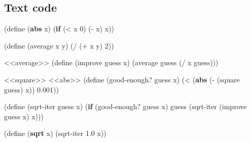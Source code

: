 \documentclass[
]{article}
\newenvironment{Shaded}{}{}
\newcommand{\DecValTok}[1]{\textcolor[rgb]{0.25,0.63,0.44}{#1}}
\newcommand{\ExtensionTok}[1]{#1}
\newcommand{\FloatTok}[1]{\textcolor[rgb]{0.25,0.63,0.44}{#1}}
\newcommand{\FunctionTok}[1]{\textcolor[rgb]{0.02,0.16,0.49}{#1}}
\newcommand{\KeywordTok}[1]{\textcolor[rgb]{0.00,0.44,0.13}{\textbf{#1}}}
\newcommand{\NormalTok}[1]{#1}
\newcommand{\OperatorTok}[1]{\textcolor[rgb]{0.40,0.40,0.40}{#1}}
\begin{document}
\hypertarget{text-code}{%
\subsection{Text code}\label{text-code}}

\hypertarget{abs}{%
\label{abs}}%
\begin{Shaded}
\begin{Highlighting}[numbers=left,,]
\NormalTok{(}\ExtensionTok{define}\FunctionTok{ }\NormalTok{(}\KeywordTok{abs}\NormalTok{ x)}
\NormalTok{  (}\KeywordTok{if}\NormalTok{ (}\OperatorTok{\textless{}}\NormalTok{ x }\DecValTok{0}\NormalTok{)}
\NormalTok{      (}\OperatorTok{{-}}\NormalTok{ x)}
\NormalTok{      x))}
\end{Highlighting}
\end{Shaded}

\hypertarget{average}{%
\label{average}}%
\begin{Shaded}
\begin{Highlighting}[numbers=left,,]
\NormalTok{(}\ExtensionTok{define}\FunctionTok{ }\NormalTok{(average x y)}
\NormalTok{  (}\OperatorTok{/}\NormalTok{ (}\OperatorTok{+}\NormalTok{ x y) }\DecValTok{2}\NormalTok{))}
\end{Highlighting}
\end{Shaded}

\hypertarget{txt-sqrt}{%
\label{txt-sqrt}}%
\begin{Shaded}
\begin{Highlighting}[numbers=left,,]
\NormalTok{\textless{}\textless{}average\textgreater{}\textgreater{}}
\NormalTok{(}\ExtensionTok{define}\FunctionTok{ }\NormalTok{(improve guess x)}
\NormalTok{  (average guess (}\OperatorTok{/}\NormalTok{ x guess)))}

\NormalTok{\textless{}\textless{}square\textgreater{}\textgreater{}}
\NormalTok{\textless{}\textless{}abs\textgreater{}\textgreater{}}
\NormalTok{(}\ExtensionTok{define}\FunctionTok{ }\NormalTok{(good{-}enough? guess x)}
\NormalTok{  (}\OperatorTok{\textless{}}\NormalTok{ (}\KeywordTok{abs}\NormalTok{ (}\OperatorTok{{-}}\NormalTok{ (square guess) x)) }\FloatTok{0.001}\NormalTok{))}

\NormalTok{(}\ExtensionTok{define}\FunctionTok{ }\NormalTok{(sqrt{-}iter guess x)}
\NormalTok{  (}\KeywordTok{if}\NormalTok{ (good{-}enough? guess x)}
\NormalTok{      guess}
\NormalTok{      (sqrt{-}iter (improve guess x) x)))}

\NormalTok{(}\ExtensionTok{define}\FunctionTok{ }\NormalTok{(}\KeywordTok{sqrt}\NormalTok{ x)}
\NormalTok{  (sqrt{-}iter }\FloatTok{1.0}\NormalTok{ x))}
\end{Highlighting}
\end{Shaded}
\end{document}
